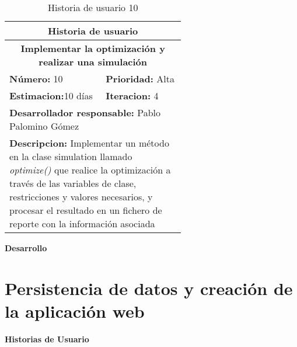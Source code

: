 \begin{table}[H]
        \centering
        \begin{tabular}{|p{0.3\linewidth}|p{0.3\linewidth}|}
          \hline
          \multicolumn{2}{|c|}{Historia de usuario}\\ \hline
          \multicolumn{2}{|c|}{\textbf{Implementar la optimización y realizar una simulación}}\\ \hline
          \textbf{Número:} 10 & \textbf{Prioridad:} Alta\\ \hline
          \textbf{Estimacion:}10 días & \textbf{Iteracion:} 4\\ \hline
          \multicolumn{2}{|l|}{\textbf{Desarrollador responsable:} Pablo Palomino Gómez}\\ \hline
          \multicolumn{2}{|p{0.6\linewidth}|}{\textbf{Descripcion:} Implementar un método en la clase simulation llamado \textit{optimize()} que realice la optimización a través de las variables de clase, restricciones y valores necesarios, y procesar el resultado en un fichero de reporte con la información asociada}\\ \hline
        \end{tabular}
        \caption{Historia de usuario 10}
        \label{tab:hist10}
\end{table}
\textbf{Desarrollo}\\


\section{Persistencia de datos y creación de la aplicación web}
\textbf{Historias de Usuario}\\

